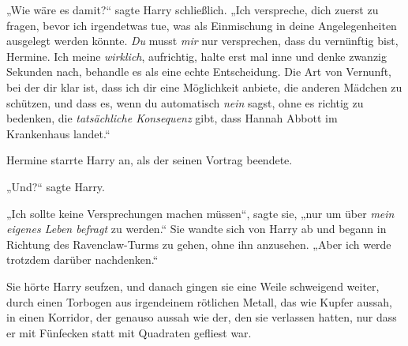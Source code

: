 „Wie wäre es damit?“ sagte Harry schließlich.
„Ich verspreche, dich zuerst zu fragen, bevor ich irgendetwas tue, was als Einmischung in deine Angelegenheiten ausgelegt werden könnte. \emph{Du} musst \emph{mir} nur versprechen, dass du vernünftig bist, Hermine. Ich meine \emph{wirklich}, aufrichtig, halte erst mal inne und denke zwanzig Sekunden nach, behandle es als eine echte Entscheidung. Die Art von Vernunft, bei der dir klar ist, dass ich dir eine Möglichkeit anbiete, die anderen Mädchen zu schützen, und dass es, wenn du automatisch \emph{nein} sagst, ohne es richtig zu bedenken, die \emph{tatsächliche Konsequenz} gibt, dass Hannah Abbott im Krankenhaus landet.“

Hermine starrte Harry an, als der seinen Vortrag beendete.

„Und?“ sagte Harry.

„Ich sollte keine Versprechungen machen müssen“, sagte sie, „nur um über \emph{mein eigenes Leben befragt} zu werden.“ Sie wandte sich von Harry ab und begann in Richtung des Ravenclaw-Turms zu gehen, ohne ihn anzusehen.
„Aber ich werde trotzdem darüber nachdenken.“

Sie hörte Harry seufzen, und danach gingen sie eine Weile schweigend weiter, durch einen Torbogen aus irgendeinem rötlichen Metall, das wie Kupfer aussah, in einen Korridor, der genauso aussah wie der, den sie verlassen hatten, nur dass er mit Fünfecken statt mit Quadraten gefliest war.

